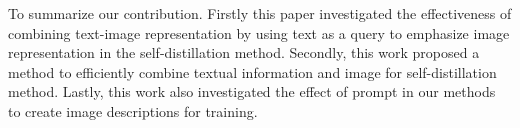 To summarize our contribution.
Firstly this paper investigated the effectiveness of combining text-image representation by using text as a query to emphasize image representation in the self-distillation method.
Secondly, this work proposed a method to efficiently combine textual information and image for self-distillation method.
Lastly, this work also investigated the effect of prompt in our methods to create image descriptions for training.





